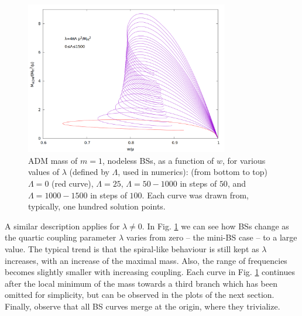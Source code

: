\begin{figure}[h!]
  \begin{center}
    \includegraphics[width=8.9cm]{papers/selfInteractions/w-vs-M-BSs2.png}
  \end{center}
  \caption{ADM mass of $m=1$, nodeless BSs, as a function of $w$, for various values of $\lambda$ (defined by $\Lambda$, used in numerics): (from bottom to top) $\Lambda=0$ (red curve), $\Lambda=25$, $\Lambda=50-1000$ in steps of $50$, and $\Lambda=1000-1500$ in steps of $100$. Each curve was drawn from, typically, one hundred solution points.}
  \label{fig:w-vs-M-BSs}
\end{figure}



A similar description applies for $\lambda\neq 0$. In Fig. \ref{fig:w-vs-M-BSs} we can see how BSs change as the quartic coupling parameter $\lambda$ varies from zero -- the mini-BS case -- to a large value. The typical trend is that the spiral-like behaviour is still kept as $\lambda$ increases, with an increase of the maximal mass. Also, the range of frequencies becomes slightly smaller with increasing coupling. Each curve in Fig. \ref{fig:w-vs-M-BSs} continues after the local minimum of the mass towards a third branch which has been omitted for simplicity, but can be observed in the plots of the next section. Finally, observe that all BS curves merge at the origin, where they trivialize. 



